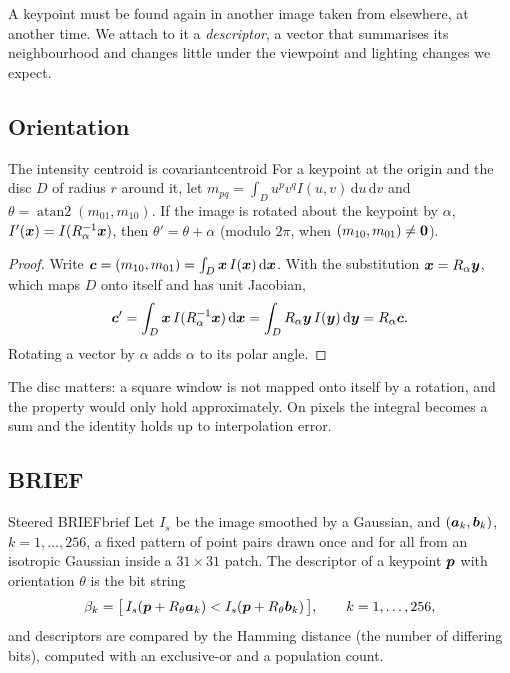 A keypoint must be found again in another image taken from elsewhere,
at another time. We attach to it a \emph{descriptor}, a vector that
summarises its neighbourhood and changes little under the viewpoint and
lighting changes we expect.

\subsection{Orientation}

\begin{proposition}{The intensity centroid is covariant}{centroid}
For a keypoint at the origin and the disc $D$ of radius $r$ around it,
let $m_{pq}=\int_Du^pv^qI(u,v)\,\mathrm du\,\mathrm dv$ and
$\theta=\operatorname{atan2}(m_{01},m_{10})$. If the image is rotated
about the keypoint by $\alpha$, $I'(\bm{x})=I(R_\alpha^{-1}\bm{x})$,
then $\theta'=\theta+\alpha$ (modulo $2\pi$, when $(m_{10},m_{01})\neq
\bm{0}$).
\end{proposition}

\begin{proof}
Write $\bm{c}=(m_{10},m_{01})=\int_D\bm{x}\,I(\bm{x})\,
\mathrm d\bm{x}$. With the substitution $\bm{x}=R_\alpha\bm{y}$,
which maps $D$ onto itself and has unit Jacobian,
\[
\bm{c}'=\int_D\bm{x}\,I(R_\alpha^{-1}\bm{x})\,\mathrm d\bm{x}=
\int_DR_\alpha\bm{y}\,I(\bm{y})\,\mathrm d\bm{y}=R_\alpha\bm{c}.
\]
Rotating a vector by $\alpha$ adds $\alpha$ to its polar angle.
\end{proof}

The disc matters: a square window is not mapped onto itself by a
rotation, and the property would only hold approximately. On pixels the
integral becomes a sum and the identity holds up to interpolation
error.

\subsection{BRIEF}

\begin{definition}{Steered BRIEF}{brief}
Let $I_s$ be the image smoothed by a Gaussian, and
$(\bm{a}_k,\bm{b}_k)$, $k=1,\dots,256$, a fixed pattern of point
pairs drawn once and for all from an isotropic Gaussian inside a
$31\times31$ patch. The descriptor of a keypoint $\bm{p}$ with orientation
$\theta$ is the bit string
\[
\beta_k=\bigl[\,I_s(\bm{p}+R_\theta\bm{a}_k)<I_s(\bm{p}+R_\theta\bm{b}_k)
\,\bigr],\qquad k=1,\dots,256,
\]
and descriptors are compared by the Hamming distance (the number of
differing bits), computed with an exclusive-or and a population count.
\end{definition}


